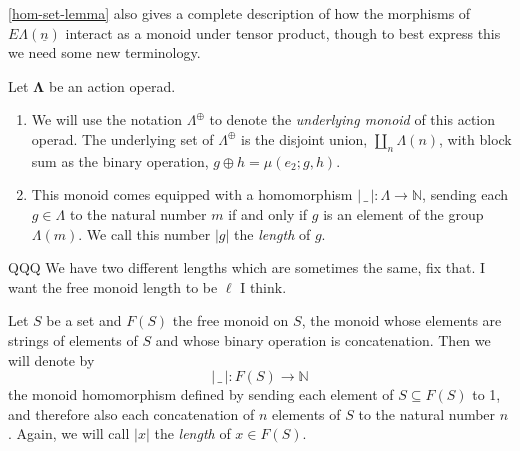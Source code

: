 \documentclass{amsbook} %
\newcommand{\ML}{\mathbf{\Lambda}}
\newcommand{\lop}{\Lambda^{\oplus}}
\newcommand{\ELn}{E\Lambda(\underline{n})}
\numberwithin{section}{chapter}
\begin{document}
\cref{hom-set-lemma} also gives a complete description of how the morphisms of $\ELn$ interact as a monoid under tensor product, though to best express this we need some new terminology.

\begin{Defi}\label{def:length} Let $\ML$ be an action operad. 
\begin{enumerate}
\item We will use the notation $\lop$ to denote the \emph{underlying monoid} of this action operad. The underlying set of $\lop$ is the disjoint union, $\coprod_n \Lambda(n)$, with block sum as the binary operation, $g \oplus h = \mu(e_2; g, h)$.

\item This monoid comes equipped with a homomorphism $| \, \_ \, | \colon \Lambda \to \mathbb{N}$, sending each $g \in \Lambda$ to the natural number $m$ if and only if $g$ is an element of the group $\Lambda(m)$. We call this number $|g|$ the \emph{length} of $g$.
\end{enumerate}
\end{Defi}

QQQ We have two different lengths which are sometimes the same, fix that. I want the free monoid length to be $\ell$ I think.

\begin{Defi}\label{lengthdef} Let $S$ be a set and $F(S)$ the free monoid on $S$, the monoid whose elements are strings of elements of $S$ and whose binary operation is concatenation. Then we will denote by
\[ | \, \_ \, | \colon F(S) \to \mathbb{N} \]
the monoid homomorphism defined by sending each element of $S \subseteq F(S)$ to 1, and therefore also each concatenation of $n$ elements of $S$ to the natural number $n$. Again, we will call $|x|$ the \emph{length} of $x \in F(S)$.
\end{Defi}
\end{document}
